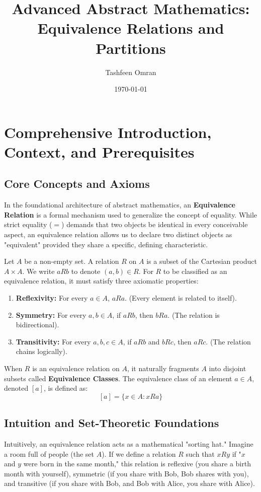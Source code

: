 \documentclass[11pt, a4paper]{article}
\theoremstyle{definition}
\theoremstyle{remark}
\begin{document}
\title{\textbf{Advanced Abstract Mathematics: Equivalence Relations and Partitions}}
\author{Tashfeen Omran}
\date{\today}
\maketitle

\tableofcontents
\newpage

\section{Comprehensive Introduction, Context, and Prerequisites}

\subsection{Core Concepts and Axioms}
In the foundational architecture of abstract mathematics, an \textbf{Equivalence Relation} is a formal mechanism used to generalize the concept of equality. While strict equality ($=$) demands that two objects be identical in every conceivable aspect, an equivalence relation allows us to declare two distinct objects as "equivalent" provided they share a specific, defining characteristic. 

Let $A$ be a non-empty set. A relation $R$ on $A$ is a subset of the Cartesian product $A \times A$. We write $a R b$ to denote $(a, b) \in R$. For $R$ to be classified as an equivalence relation, it must satisfy three axiomatic properties:
\begin{enumerate}
    \item \textbf{Reflexivity:} For every $a \in A$, $a R a$. (Every element is related to itself).
    \item \textbf{Symmetry:} For every $a, b \in A$, if $a R b$, then $b R a$. (The relation is bidirectional).
    \item \textbf{Transitivity:} For every $a, b, c \in A$, if $a R b$ and $b R c$, then $a R c$. (The relation chains logically).
\end{enumerate}

When $R$ is an equivalence relation on $A$, it naturally fragments $A$ into disjoint subsets called \textbf{Equivalence Classes}. The equivalence class of an element $a \in A$, denoted $[a]$, is defined as:
\[ [a] = \{ x \in A : x R a \} \]

\subsection{Intuition and Set-Theoretic Foundations}
Intuitively, an equivalence relation acts as a mathematical "sorting hat." Imagine a room full of people (the set $A$). If we define a relation $R$ such that $x R y$ if "$x$ and $y$ were born in the same month," this relation is reflexive (you share a birth month with yourself), symmetric (if you share with Bob, Bob shares with you), and transitive (if you share with Bob, and Bob with Alice, you share with Alice). 
\end{document}
